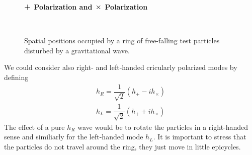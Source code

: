 \begin{figure}
\centering
    \textbf{$\mathlarger{\mathlarger{+}}$ Polarization and $\mathlarger{\mathlarger{\times}}$ Polarization}\par\medskip
\centering
{} \quad
{} \\
\caption{Spatial positions occupied by a ring of free-falling test particles disturbed by a gravitational wave.}
\label{plus_and_times}
\end{figure}
We could consider also right- and left-handed cricularly polarized modes by defining
\begin{eqnarray}
\label{r_polarized}
h_{R} = \dfrac{1}{\sqrt{2}} (h_{+} - i h_{\times})
\\
\label{l_polarized}
h_{L} = \dfrac{1}{\sqrt{2}} (h_{+} + i h_{\times})
\end{eqnarray}
The effect of a pure $h_R$ wave would be to rotate the particles in a right-handed sense and similiarly for the left-handed mode $h_{L}$. 
It is important to stress that the particles do not travel around the ring, they just move in little epicycles.\\
